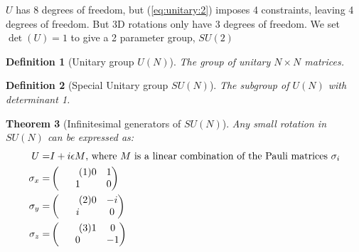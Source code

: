 \documentclass[]{article}
\newcommand\numberthis{\addtocounter{equation}{1}\tag{\theequation}}
\newtheorem{thm}{Theorem}
\newtheorem{defn}[thm]{Definition}
\begin{document}
$U$ has 8 degrees of freedom, but (\ref{eq:unitary:2}) imposes 4 constraints, leaving 4 degrees of freedom. But 3D rotations only have 3 degrees of freedom. We set $\det(U)=1$ to give a 2 parameter group, $SU(2)$

\begin{defn}[Unitary group $U(N)$]
	The group of unitary $N\times N$ matrices.
\end{defn}

\begin{defn}[Special Unitary group $SU(N)$]
	The subgroup of $U(N)$ with determinant 1.
\end{defn}

\begin{thm}[Infinitesimal generators of $SU(N)$]
	Any small rotation in $SU(N)$ can be expressed as:
	\begin{align*}
		U =& I + i \epsilon M \text{, where $M$ is a linear combination of the Pauli matrices $\sigma_i$}\\
		\sigma_x =& \begin{pmatrix} \numberthis \label{eq:pauli:x}
		0&1\\
		1&0
		\end{pmatrix}\\
		\sigma_y =& \begin{pmatrix} \numberthis \label{eq:pauli:y}
		0&-i\\
		i&0
		\end{pmatrix}\\
		\sigma_z =& \begin{pmatrix} \numberthis \label{eq:pauli:z}
		1&0\\
		0&-1
		\end{pmatrix}
	\end{align*}
\end{thm}
\end{document}

